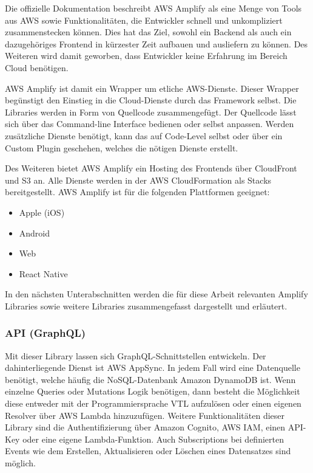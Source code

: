 Die offizielle Dokumentation beschreibt \ac{AWS} Amplify als eine Menge von Tools aus \ac{AWS} sowie Funktionalitäten, die Entwickler schnell und unkompliziert zusammenstecken können. Dies hat das Ziel, sowohl ein Backend als auch ein dazugehöriges Frontend in kürzester Zeit aufbauen und ausliefern zu können. Des Weiteren wird damit geworben, dass Entwickler keine Erfahrung im Bereich Cloud benötigen.

\ac{AWS} Amplify ist damit ein Wrapper um etliche \ac{AWS}-Dienste. Dieser Wrapper begünstigt den Einstieg in die Cloud-Dienste durch das Framework selbst. Die Libraries werden in Form von Quellcode zusammengefügt. Der Quellcode lässt sich über das Command-line Interface bedienen oder selbst anpassen. Werden zusätzliche Dienste benötigt, kann das auf Code-Level selbst oder über ein Custom Plugin geschehen, welches die nötigen Dienste erstellt.

Des Weiteren bietet \ac{AWS} Amplify ein Hosting des Frontends über CloudFront und S3 an. Alle Dienste werden in der \ac{AWS} CloudFormation als Stacks bereitgestellt. \ac{AWS} Amplify ist für die folgenden Plattformen geeignet:
\begin{itemize}
  \item Apple (iOS)
  \item Android
  \item Web
  \item React Native
\end{itemize}

In den nächsten Unterabschnitten werden die für diese Arbeit relevanten Amplify Libraries sowie weitere Libraries zusammengefasst dargestellt und erläutert.

\subsubsection{API (GraphQL)}

Mit dieser Library lassen sich GraphQL-Schnittstellen entwickeln. Der dahinterliegende Dienst ist \ac{AWS} AppSync. In jedem Fall wird eine Datenquelle benötigt, welche häufig die NoSQL-Datenbank Amazon DynamoDB ist. Wenn einzelne Queries oder Mutations Logik benötigen, dann besteht die Möglichkeit diese entweder mit der Programmiersprache VTL aufzulösen oder einen eigenen Resolver über \ac{AWS} Lambda hinzuzufügen. Weitere Funktionalitäten dieser Library sind die Authentifizierung über Amazon Cognito, \ac{AWS} IAM, einen API-Key oder eine eigene Lambda-Funktion. Auch Subscriptions bei definierten Events wie dem Erstellen, Aktualisieren oder Löschen eines Datensatzes sind möglich.

